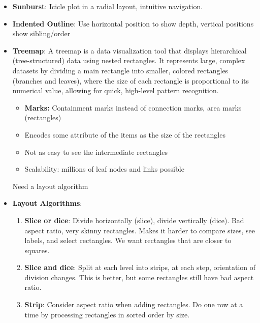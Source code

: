 \documentclass{report}
\begin{document}
\begin{itemize}
            \begin{itemize}
                \item \textbf{Benefit:} space usage, labels
            \end{itemize}
        \item \textbf{Sunburst}: Icicle plot in a radial layout, intuitive navigation.
            \bigbreak \noindent 
        \item \textbf{Indented Outline}: Use horizontal position to show depth, vertical positions show sibling/order
            \bigbreak \noindent 
        \item \textbf{Treemap}: A treemap is a data visualization tool that displays hierarchical (tree-structured) data using nested rectangles. It represents large, complex datasets by dividing a main rectangle into smaller, colored rectangles (branches and leaves), where the size of each rectangle is proportional to its numerical value, allowing for quick, high-level pattern recognition. 
            \bigbreak \noindent 
            \begin{itemize}
                \item \textbf{Marks:} Containment marks instead of connection marks, area marks (rectangles)
                \item Encodes some attribute of the items as the size of the rectangles
                \item Not as easy to see the intermediate rectangles
                \item Scalability: millions of leaf nodes and links possible
            \end{itemize}
            Need a layout algorithm
        \item \textbf{Layout Algorithms}: 
            \begin{enumerate}
                \item \textbf{Slice or dice}:  Divide horizontally (slice), divide vertically (dice). Bad aspect ratio, very skinny rectangles. Makes it harder to compare sizes, see labels, and select rectangles. We want rectangles that are closer to squares.
                \item \textbf{Slice and dice}: Split at each level into strips, at each step, orientation of division changes. This is better, but some rectangles still have bad aspect ratio.
                \item \textbf{Strip}: Consider aspect ratio when adding rectangles. Do one row at a time by processing rectangles in sorted order by size.

\end{enumerate}
\end{itemize}
\end{document}
